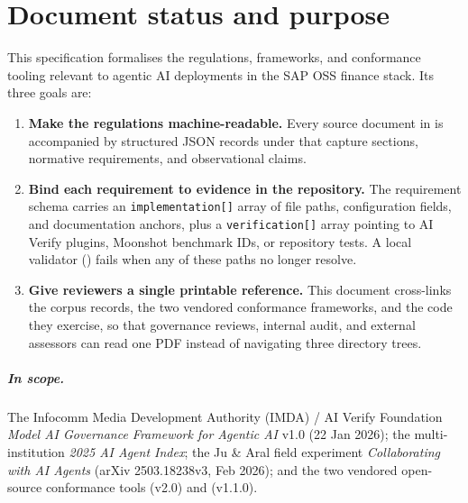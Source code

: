 
\chapter*{Document status and purpose}

This specification formalises the regulations, frameworks, and conformance
tooling relevant to agentic AI deployments in the SAP OSS finance stack. Its
three goals are:

\begin{enumerate}
  \item \textbf{Make the regulations machine-readable.} Every source document
        in  is accompanied by structured JSON records under
         that capture sections, normative requirements,
        and observational claims.
  \item \textbf{Bind each requirement to evidence in the repository.} The
        requirement schema carries an \texttt{implementation[]} array of file
        paths, configuration fields, and documentation anchors, plus a
        \texttt{verification[]} array pointing to AI Verify plugins, Moonshot
        benchmark IDs, or repository tests. A local validator
        () fails when any of these paths no
        longer resolve.
  \item \textbf{Give reviewers a single printable reference.} This document
        cross-links the corpus records, the two vendored conformance
        frameworks, and the code they exercise, so that governance reviews,
        internal audit, and external assessors can read one PDF instead of
        navigating three directory trees.
\end{enumerate}

\paragraph{In scope.} The Infocomm Media Development Authority (IMDA) / AI Verify
Foundation \emph{Model AI Governance Framework for Agentic AI} v1.0 (22 Jan
2026); the multi-institution \emph{2025 AI Agent Index}; the Ju \& Aral field
experiment \emph{Collaborating with AI Agents} (arXiv 2503.18238v3, Feb 2026);
and the two vendored open-source conformance tools
 (v2.0) and  (v1.1.0).


